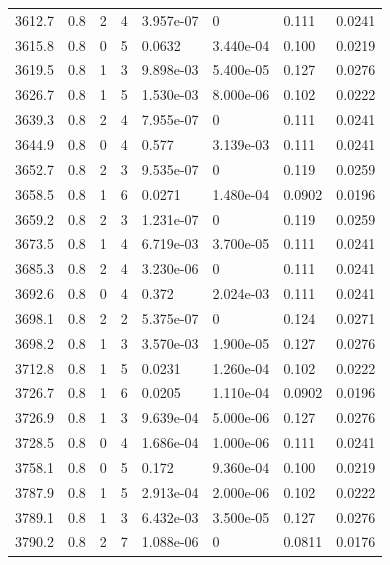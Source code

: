 \documentclass[preview]{standalone}
\begin{document}
{{{{{{{{{\begin{tabular}{L{1.2cm}C{1.2cm} C{0.3cm}C{0.5cm} C{1.4cm}C{1.4cm} C{1.4cm}C{1.4cm}}
  3612.7  &   0.8  & 2     &  4 &  3.957e-07  & 0  & 0.111 &  0.0241   \\ 
  3615.8  &   0.8  & 0     &  5 &  0.0632  & 3.440e-04  & 0.100 &  0.0219   \\ 
  3619.5  &   0.8  & 1     &  3 &  9.898e-03  & 5.400e-05  & 0.127 &  0.0276   \\ 
  3626.7  &   0.8  & 1     &  5 &  1.530e-03  & 8.000e-06  & 0.102 &  0.0222   \\ 
  3639.3  &   0.8  & 2     &  4 &  7.955e-07  & 0  & 0.111 &  0.0241   \\ 
  3644.9  &   0.8  & 0     &  4 &  0.577  & 3.139e-03  & 0.111 &  0.0241   \\ 
  3652.7  &   0.8  & 2     &  3 &  9.535e-07  & 0  & 0.119 &  0.0259   \\ 
  3658.5  &   0.8  & 1     &  6 &  0.0271  & 1.480e-04  & 0.0902 &  0.0196   \\ 
  3659.2  &   0.8  & 2     &  3 &  1.231e-07  & 0  & 0.119 &  0.0259   \\ 
  3673.5  &   0.8  & 1     &  4 &  6.719e-03  & 3.700e-05  & 0.111 &  0.0241   \\ 
  3685.3  &   0.8  & 2     &  4 &  3.230e-06  & 0  & 0.111 &  0.0241   \\ 
  3692.6  &   0.8  & 0     &  4 &  0.372  & 2.024e-03  & 0.111 &  0.0241   \\ 
  3698.1  &   0.8  & 2     &  2 &  5.375e-07  & 0  & 0.124 &  0.0271   \\ 
  3698.2  &   0.8  & 1     &  3 &  3.570e-03  & 1.900e-05  & 0.127 &  0.0276   \\ 
  3712.8  &   0.8  & 1     &  5 &  0.0231  & 1.260e-04  & 0.102 &  0.0222   \\ 
  3726.7  &   0.8  & 1     &  6 &  0.0205  & 1.110e-04  & 0.0902 &  0.0196   \\ 
  3726.9  &   0.8  & 1     &  3 &  9.639e-04  & 5.000e-06  & 0.127 &  0.0276   \\ 
  3728.5  &   0.8  & 0     &  4 &  1.686e-04  & 1.000e-06  & 0.111 &  0.0241   \\ 
  3758.1  &   0.8  & 0     &  5 &  0.172  & 9.360e-04  & 0.100 &  0.0219   \\ 
  3787.9  &   0.8  & 1     &  5 &  2.913e-04  & 2.000e-06  & 0.102 &  0.0222   \\ 
  3789.1  &   0.8  & 1     &  3 &  6.432e-03  & 3.500e-05  & 0.127 &  0.0276   \\ 
  3790.2  &   0.8  & 2     &  7 &  1.088e-06  & 0  & 0.0811 &  0.0176   \\ 

\end{tabular}}}}}}}}}}
\end{document}
